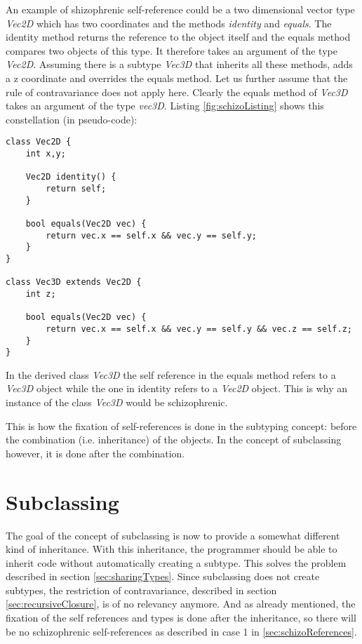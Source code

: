 An example of shizophrenic self-reference could be a two dimensional
vector type \emph{Vec2D} which has two coordinates and the methods
\emph{identity} and \emph{equals}. The identity method returns the
reference to the object itself and the equals method compares two
objects of this type. It therefore takes an argument of the type
\emph{Vec2D}. Assuming there is a subtype \emph{Vec3D} that inherits
all these methods, adds a z coordinate and overrides the equals
method. Let us further assume that the rule of contravariance does not
apply here. Clearly the equals method of \emph{Vec3D} takes an argument
of the type \emph{vec3D}. Listing \ref{fig:schizoListing} shows this
constellation (in pseudo-code):

\begin{lstlisting}[caption={An example of schizophrenic self-reference},label={fig:schizoListing}]
class Vec2D {
	int x,y;

	Vec2D identity() {
		return self;
	}

	bool equals(Vec2D vec) {
		return vec.x == self.x && vec.y == self.y;
	}
}

class Vec3D extends Vec2D {
	int z;

	bool equals(Vec2D vec) {
		return vec.x == self.x && vec.y == self.y && vec.z == self.z;
	}
}
\end{lstlisting}

In the derived class \emph{Vec3D} the self reference in the equals 
method refers to a \emph{Vec3D} object while the one in identity
refers to a \emph{Vec2D} object. This is why an instance of the class
\emph{Vec3D} would be schizophrenic.

This is how the fixation of self-references is done in the subtyping
concept: before the combination (i.e. inheritance) of the objects. In the
concept of subclassing however, it is done after the combination.

\section{Subclassing}

The goal of the concept of subclassing is now to provide a somewhat
different kind of inheritance. With this inheritance, the programmer should
be able to inherit code without automatically creating a subtype. 
This solves the problem described in section \ref{sec:sharingTypes}. Since
subclassing does not create subtypes, the restriction of contravariance, 
described in section \ref{sec:recursiveClosure}, is of no relevancy
anymore. And as already mentioned, the fixation of the self
references and types is done after the inheritance, so there will be no
schizophrenic self-references as described in case 1 in 
\ref{sec:schizoReferences}. \\

